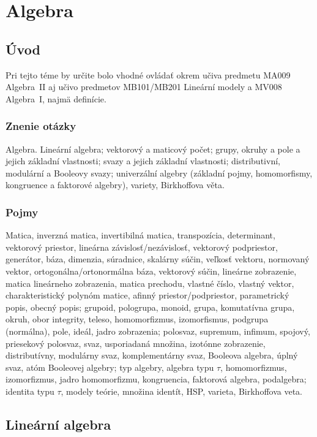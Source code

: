\section{Algebra}

\subsection{Úvod}
Pri tejto téme by určite bolo vhodné ovládať
okrem učiva predmetu MA009 Algebra~II aj učivo
predmetov MB101/MB201 Lineární modely a MV008 Algebra~I, 
najmä definície.

\subsubsection*{Znenie otázky}
Algebra. Lineární algebra; vektorový a maticový počet; grupy, okruhy
a pole a jejich základní vlastnosti; svazy a jejich základní vlastnosti;
distributivní, modulární a Booleovy svazy; univerzální algebry (základní 
pojmy, homomorfismy, kongruence a faktorové algebry), variety, Birkhoffova věta.

\subsubsection*{Pojmy}
Matica, inverzná matica, invertibilná matica, transpozícia, determinant,
vektorový priestor, lineárna závislosť/nezávislosť, vektorový podpriestor,
generátor, báza, dimenzia, súradnice, skalárny súčin, veľkosť vektoru,
normovaný vektor, ortogonálna/ortonormálna báza, vektorový súčin, lineárne
zobrazenie, matica lineárneho zobrazenia, matica prechodu, vlastné číslo, 
vlastný vektor, charakteristický polynóm matice, afinný priestor/podpriestor,
parametrický popis, obecný popis; grupoid, pologrupa, monoid, grupa,
komutatívna grupa, okruh, obor integrity, teleso, homomorfizmus, izomorfismus,
podgrupa (normálna), pole, ideál, jadro zobrazenia; polosvaz, supremum, infimum,
spojový, priesekový polosvaz, svaz, usporiadaná množina, izotónne zobrazenie,
distributívny, modulárny svaz, komplementárny svaz, Booleova algebra, úplný
svaz, atóm Booleovej algebry; typ algebry, algebra typu $\tau$, homomorfizmus,
izomorfizmus, jadro homomorfizmu, kongruencia, faktorová algebra, podalgebra;
identita typu $\tau$, modely teórie, množina identít, HSP, varieta, Birkhoffova veta.

\subsection{Lineární algebra}

